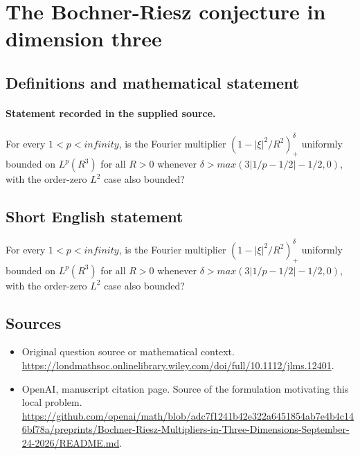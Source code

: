 \documentclass[11pt]{article}
\begin{document}
\section*{The Bochner-Riesz conjecture in dimension three}\label{statement}
\subsection{Definitions and mathematical statement}
\paragraph{Statement recorded in the supplied source.}
For every $1<p<infinity$, is the Fourier multiplier $(1-|\xi |^2/R^2)_+^\delta $ uniformly bounded on $L^p(R^3)$ for all $R>0$ whenever $\delta >max(3|1/p-1/2|-1/2,0)$, with the order-zero $L^2$ case also bounded?
\subsection{Short English statement}
For every $1<p<infinity$, is the Fourier multiplier $(1-|\xi |^2/R^2)_+^\delta $ uniformly bounded on $L^p(R^3)$ for all $R>0$ whenever $\delta >max(3|1/p-1/2|-1/2,0)$, with the order-zero $L^2$ case also bounded?
\subsection{Sources}
\begin{itemize}
\item[S1] Original question source or mathematical context.
\url{https://londmathsoc.onlinelibrary.wiley.com/doi/full/10.1112/jlms.12401}.
\item[S2] OpenAI, manuscript citation page. Source of the formulation motivating this local problem.
\url{https://github.com/openai/math/blob/adc7f1241b42e322a6451854ab7e4b4c146bf78a/preprints/Bochner-Riesz-Multipliers-in-Three-Dimensions-September-24-2026/README.md}.
\end{itemize}
\end{document}
